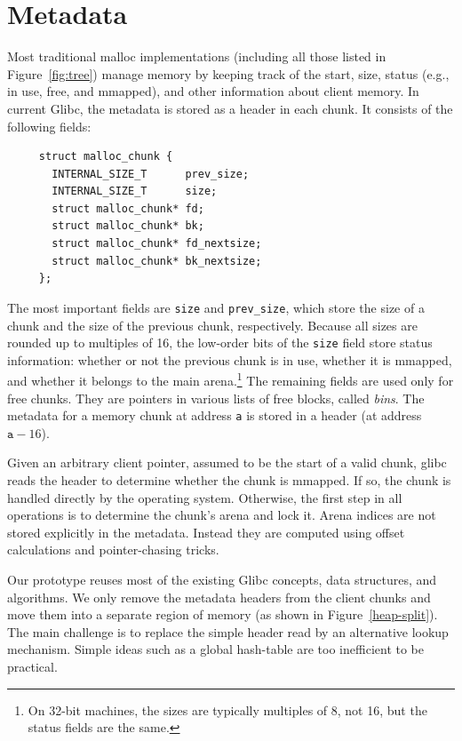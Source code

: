\documentclass[twoside,12pt]{cslreport}
\begin{document}
\section{Metadata}

Most traditional malloc implementations (including all those listed in
Figure~\ref{fig:tree}) manage memory by keeping track of the start,
size, status (e.g., in use, free, and mmapped), and other information
about client memory. In current Glibc, the metadata is stored as a header
in each chunk. It consists of the following fields:
\begin{small}
\begin{verbatim}
     struct malloc_chunk {  
       INTERNAL_SIZE_T      prev_size; 
       INTERNAL_SIZE_T      size;
       struct malloc_chunk* fd;
       struct malloc_chunk* bk;
       struct malloc_chunk* fd_nextsize;
       struct malloc_chunk* bk_nextsize;
     };
\end{verbatim}
\end{small}
The most important fields are \texttt{size} and \texttt{prev\_size},
which store the size of a chunk and the size of the previous chunk,
respectively. Because all sizes are rounded up to multiples of 16, the
low-order bits of the \texttt{size} field store status information:
whether or not the previous chunk is in use, whether it is mmapped,
and whether it belongs to the main arena.\footnote{On 32-bit machines,
  the sizes are typically multiples of 8, not 16, but the status
  fields are the same.}  The remaining fields are used only for free
chunks. They are pointers in various lists of free blocks, called
\emph{bins}.  The metadata for a memory chunk at address \texttt{a} is
stored in a header (at address $\texttt{a} - 16$).

Given an arbitrary client pointer, assumed to be the start of a valid
chunk, glibc reads the header to determine whether the chunk is
mmapped. If so, the chunk is handled directly by the operating system.
Otherwise, the first step in all operations is to determine the
chunk's arena and lock it. Arena indices are not stored explicitly in
the metadata. Instead they are computed using offset calculations and
pointer-chasing tricks.

\bigskip

Our prototype reuses most of the existing Glibc concepts, data
structures, and algorithms. We only remove the metadata headers from
the client chunks and move them into a separate region of memory (as
shown in Figure~\ref{heap-split}). The main challenge is to replace
the simple header read by an alternative lookup mechanism. Simple
ideas such as a global hash-table are too inefficient to be practical.
\end{document}
